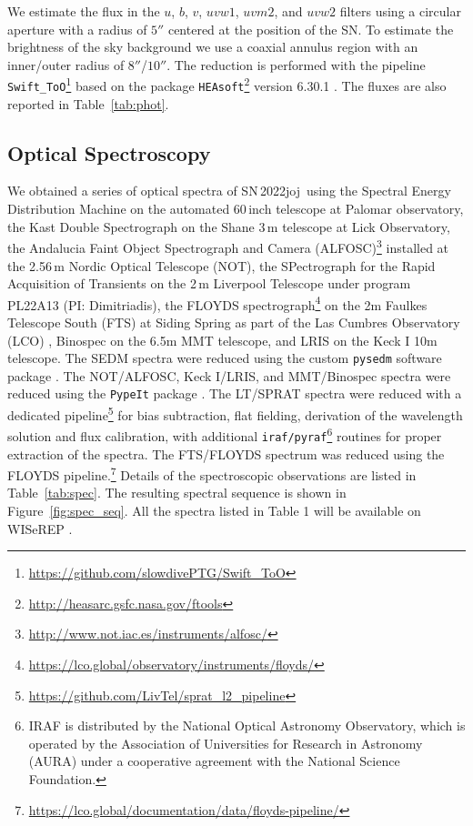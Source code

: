 \documentclass[twocolumn]{aastex631}
\newcommand{\sn}{SN\,2022joj}
\begin{document}
\begin{CJK*}{UTF8}{gbsn}
We estimate the flux in the $u$, $b$, $v$, $uvw1$, $uvm2$, and $uvw2$ filters using a circular aperture with a radius of $5''$ centered at the position of the SN. To estimate the brightness of the sky background we use a coaxial annulus region with an inner/outer radius of $8''$/$10''$. The reduction is performed with the pipeline \texttt{Swift\_ToO}\footnote{\url{https://github.com/slowdivePTG/Swift\_ToO}} based on the package \texttt{HEAsoft}\footnote{\url{http://heasarc.gsfc.nasa.gov/ftools}} version 6.30.1 \citep{HEAsoft_2014}. The fluxes are also reported in Table~\ref{tab:phot}.


\subsection{Optical Spectroscopy}\label{sec:optical_spec}

We obtained a series of optical spectra of \sn\ using the Spectral Energy Distribution Machine \citep[SEDM;][]{SEDM_2018} on the automated 60\,inch telescope \citep[P60;][]{P60_2006} at Palomar observatory, the Kast Double Spectrograph \citep{miller1994kast} on the Shane 3\,m telescope at Lick Observatory, the Andalucia Faint Object Spectrograph and Camera (ALFOSC)\footnote{\url{http://www.not.iac.es/instruments/alfosc/}} installed at the 2.56\,m Nordic Optical Telescope (NOT), the SPectrograph for the Rapid Acquisition of Transients \citep[SPRAT;][]{SPRAT_2014} on the 2\,m Liverpool Telescope \citep[LT;][]{LT_2004} under program PL22A13 (PI: Dimitriadis), the FLOYDS spectrograph\footnote{\url{https://lco.global/observatory/instruments/floyds/}} on the 2m Faulkes Telescope South (FTS) at Siding Spring as part of the Las Cumbres Observatory (LCO) \citep{LCOGT_2013}, Binospec on the 6.5m MMT telescope, and LRIS on the Keck I 10m telescope. The SEDM spectra were reduced using the custom \texttt{pysedm} software package \citep{Rigault_pysedm_2019}. The NOT/ALFOSC, Keck I/LRIS, and MMT/Binospec spectra were reduced using the \texttt{PypeIt} package \citep{pypeit:joss_pub}. The LT/SPRAT spectra were reduced with a dedicated pipeline\footnote{\url{https://github.com/LivTel/sprat\_l2\_pipeline}} for bias subtraction, flat fielding, derivation of the wavelength solution and flux calibration, with additional \texttt{iraf/pyraf}\footnote{IRAF is distributed by the National Optical Astronomy Observatory, which is operated by the Association of Universities for Research in Astronomy (AURA) under a cooperative agreement with the National Science Foundation.} routines for proper extraction of the spectra. The FTS/FLOYDS spectrum was reduced using the FLOYDS pipeline.\footnote{\url{https://lco.global/documentation/data/floyds-pipeline/}} Details of the spectroscopic observations are listed in Table~\ref{tab:spec}. The resulting spectral sequence is shown in Figure~\ref{fig:spec_seq}. All the spectra listed in Table 1 will be available on WISeREP \citep{wiserep_2012}.


\end{CJK*}
\end{document}
